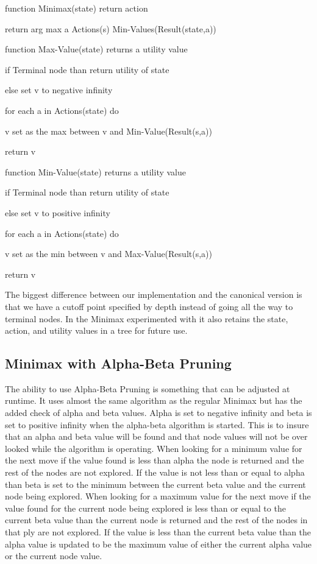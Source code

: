 \documentclass[12pt,letterpaper]{article}
\begin{document}
function Minimax(state) return action

return arg max a \in Actions(s) Min-Values(Result(state,a)) \newline

function Max-Value(state) returns a utility value

if Terminal node than return utility of state

else set v to negative infinity

for each a in Actions(state) do

v set as the max between v and Min-Value(Result(s,a))

return v \newline

function Min-Value(state) returns a utility value

if Terminal node than return utility of state

else set v to positive infinity

for each a in Actions(state) do

v set as the min between v and Max-Value(Result(s,a))

return v \newline

The biggest difference between our implementation and the canonical version is that we have a cutoff point specified by depth instead of going all the way to terminal nodes. In the Minimax experimented with it also retains the state, action, and utility values in a tree for future use.
 

\subsection{Minimax with Alpha-Beta Pruning}
 The ability to use Alpha-Beta Pruning is something that can be adjusted at runtime. It uses almost the same algorithm as the regular Minimax but has the added check of alpha and beta values. Alpha is set to negative infinity and beta is set to positive infinity when the alpha-beta algorithm is started. This is to insure that an alpha and beta value will be found and that node values will not be over looked while the algorithm is operating. When looking for a minimum value for the next move if the value found is less than alpha the node is returned and the rest of the nodes are not explored. If the value is not less than or equal to alpha than beta is set to the minimum between the current beta value and the current node being explored. When looking for a maximum value for the next move if the value found for the current node being explored is less than or equal to the current beta value than the current node is returned and the rest of the nodes in that ply are not explored. If the value is less than the current beta value than the alpha value is updated to be the maximum value of either the current alpha value or the current node value. 
\end{document}
